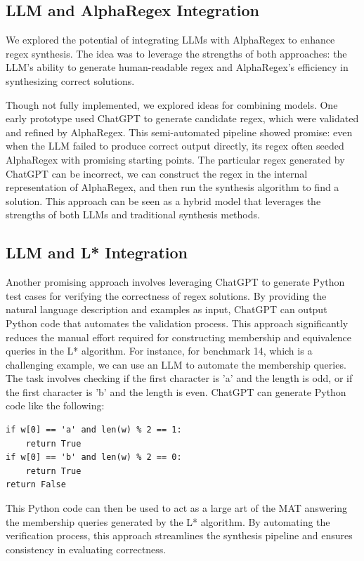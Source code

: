 \subsection{LLM and AlphaRegex Integration}
\indent\indent We explored the potential of integrating LLMs with AlphaRegex to enhance regex synthesis. The idea was to leverage the strengths of both approaches: the LLM's ability to generate human-readable regex and AlphaRegex's efficiency in synthesizing correct solutions.

\indent\indent Though not fully implemented, we explored ideas for combining models. One early prototype used ChatGPT to generate candidate regex, which were validated and refined by AlphaRegex. This semi-automated pipeline showed promise: even when the LLM failed to produce correct output directly, its regex often seeded AlphaRegex with promising starting points. The particular regex generated by ChatGPT can be incorrect, we can construct the regex in the internal representation of AlphaRegex, and then run the synthesis algorithm to find a solution. This approach can be seen as a hybrid model that leverages the strengths of both LLMs and traditional synthesis methods. 

\subsection{LLM and L* Integration}
\indent\indent Another promising approach involves leveraging ChatGPT to generate Python test cases for verifying the correctness of regex solutions. By providing the natural language description and examples as input, ChatGPT can output Python code that automates the validation process. This approach significantly reduces the manual effort required for constructing membership and equivalence queries in the L* algorithm.
\indent\indent For instance, for benchmark 14, which is a challenging example, we can use an LLM to automate the membership queries. The task involves checking if the first character is 'a' and the length is odd, or if the first character is 'b' and the length is even. ChatGPT can generate Python code like the following:

\begin{verbatim}
if w[0] == 'a' and len(w) % 2 == 1:
    return True
if w[0] == 'b' and len(w) % 2 == 0:
    return True
return False
\end{verbatim}

\indent\indent This Python code can then be used to act as a large art of the MAT answering the membership queries generated by the L* algorithm. By automating the verification process, this approach streamlines the synthesis pipeline and ensures consistency in evaluating correctness.

